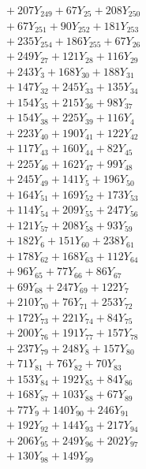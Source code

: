 \documentclass[a4paper,10pt]{article}
\begin{document}
{\begin{align}
&\quad  + 207Y_{249} + 67Y_{25} + 208Y_{250} \\[0.5ex]
&\quad  + 67Y_{251} + 90Y_{252} + 181Y_{253} \\[0.5ex]
&\quad  + 235Y_{254} + 186Y_{255} + 67Y_{26} \\[0.5ex]
&\quad  + 249Y_{27} + 121Y_{28} + 116Y_{29} \\[0.5ex]
&\quad  + 243Y_{3} + 168Y_{30} + 188Y_{31} \\[0.5ex]
&\quad  + 147Y_{32} + 245Y_{33} + 135Y_{34} \\[0.5ex]
&\quad  + 154Y_{35} + 215Y_{36} + 98Y_{37} \\[0.5ex]
&\quad  + 154Y_{38} + 225Y_{39} + 116Y_{4} \\[0.5ex]
&\quad  + 223Y_{40} + 190Y_{41} + 122Y_{42} \\[0.5ex]
&\quad  + 117Y_{43} + 160Y_{44} + 82Y_{45} \\[0.5ex]
&\quad  + 225Y_{46} + 162Y_{47} + 99Y_{48} \\[0.5ex]
&\quad  + 245Y_{49} + 141Y_{5} + 196Y_{50} \\[0.5ex]
&\quad  + 164Y_{51} + 169Y_{52} + 173Y_{53} \\[0.5ex]
&\quad  + 114Y_{54} + 209Y_{55} + 247Y_{56} \\[0.5ex]
&\quad  + 121Y_{57} + 208Y_{58} + 93Y_{59} \\[0.5ex]
&\quad  + 182Y_{6} + 151Y_{60} + 238Y_{61} \\[0.5ex]
&\quad  + 178Y_{62} + 168Y_{63} + 112Y_{64} \\[0.5ex]
&\quad  + 96Y_{65} + 77Y_{66} + 86Y_{67} \\[0.5ex]
&\quad  + 69Y_{68} + 247Y_{69} + 122Y_{7} \\[0.5ex]
&\quad  + 210Y_{70} + 76Y_{71} + 253Y_{72} \\[0.5ex]
&\quad  + 172Y_{73} + 221Y_{74} + 84Y_{75} \\[0.5ex]
&\quad  + 200Y_{76} + 191Y_{77} + 157Y_{78} \\[0.5ex]
&\quad  + 237Y_{79} + 248Y_{8} + 157Y_{80} \\[0.5ex]
&\quad  + 71Y_{81} + 76Y_{82} + 70Y_{83} \\[0.5ex]
&\quad  + 153Y_{84} + 192Y_{85} + 84Y_{86} \\[0.5ex]
&\quad  + 168Y_{87} + 103Y_{88} + 67Y_{89} \\[0.5ex]
&\quad  + 77Y_{9} + 140Y_{90} + 246Y_{91} \\[0.5ex]
&\quad  + 192Y_{92} + 144Y_{93} + 217Y_{94} \\[0.5ex]
&\quad  + 206Y_{95} + 249Y_{96} + 202Y_{97} \\[0.5ex]
&\quad  + 130Y_{98} + 149Y_{99}\nonumber
\end{align}
}
\end{document}
